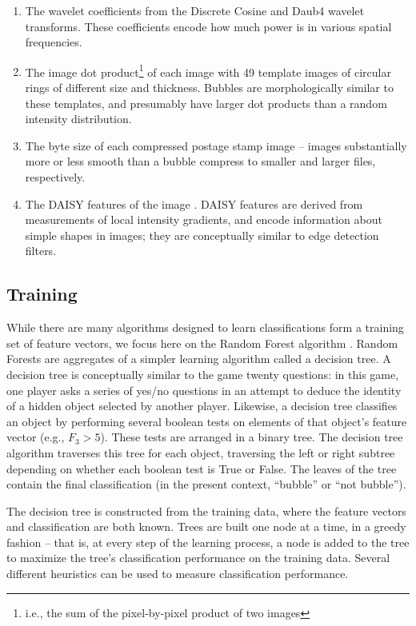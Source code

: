 \documentclass[preprint]{aastex}
\begin{document}
\begin{enumerate}
\item The wavelet coefficients from the Discrete Cosine and Daub4 wavelet transforms. These coefficients encode how much power is in various spatial frequencies.
\item The image dot product\footnote{i.e., the sum of the pixel-by-pixel product of two images} of each image with 49 template images of circular rings of different size and thickness. Bubbles are morphologically similar to these templates, and presumably have larger dot products than a random intensity distribution.
\item The byte size of each compressed postage stamp image -- images substantially more or less smooth than a bubble compress to smaller and larger files, respectively.
\item The DAISY features of the image \citep{DAISY}. DAISY features are derived from measurements of local intensity gradients, and encode information about simple shapes in images; they are conceptually similar to edge detection filters.
\end{enumerate}

\subsection{Training}
While there are many algorithms designed to learn classifications form a training set of feature vectors, we focus here on the Random Forest algorithm \citep{Breiman01}. Random Forests are aggregates of a simpler learning algorithm called a decision tree. A decision tree is conceptually similar to the game twenty questions: in this game, one player asks a series of yes/no questions in an attempt to deduce the identity of a hidden object selected by another player. Likewise, a decision tree classifies an object by performing several boolean tests on elements of that object's feature vector (e.g., $F_3 > 5$). These tests are arranged in a binary tree. The decision tree algorithm traverses this tree for each object, traversing the left or right subtree depending on whether each boolean test is True or False. The leaves of the tree contain the final classification (in the present context, ``bubble'' or ``not bubble'').

The decision tree is constructed from the training data, where the feature vectors and classification are both known. Trees are built one node at a time, in a greedy fashion -- that is, at every step of the learning process, a node is added to the tree to maximize the tree's classification performance on the training data. Several different heuristics can be used to measure classification performance.
\end{document}
